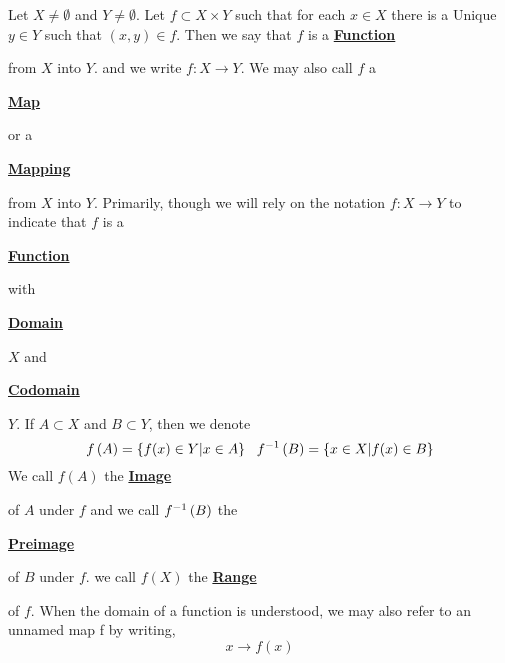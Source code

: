 \newcommand{\Function}[0]{
    \textbf{\hyperref[def:Function]{Function}}
}
\newcommand{\Functions}[0]{
    \textbf{\hyperref[def:Function]{Functions}}
}
\newcommand{\Map}[0]{
    \textbf{\hyperref[def:Function]{Map}}
}
\newcommand{\Maps}[0]{
    \textbf{\hyperref[def:Function]{Maps}}
}
\newcommand{\Mapping}[0]{
    \textbf{\hyperref[def:Function]{Mapping}}
}
\newcommand{\Mappings}[0]{
    \textbf{\hyperref[def:Function]{Mappings}}
}

\newcommand{\FunctionDomain}[0]{
    \textbf{\hyperref[def:Function]{Domain}}
}
\newcommand{\FunctionDomains}[0]{
    \textbf{\hyperref[def:Function]{Domains}}
}
\newcommand{\FunctionCodomain}[0]{
    \textbf{\hyperref[def:Function]{Codomain}}
}
\newcommand{\FunctionCodomains}[0]{
    \textbf{\hyperref[def:Function]{Codomains}}
}
\newcommand{\FunctionRange}[0]{
    \textbf{\hyperref[def:Function]{Range}}
}
\newcommand{\FunctionRanges}[0]{
    \textbf{\hyperref[def:Function]{Ranges}}
}

\newcommand{\FunctionImage}[0]{
    \textbf{\hyperref[def:Function]{Image}}
}
\newcommand{\FunctionImages}[0]{
    \textbf{\hyperref[def:Function]{Images}}
}
\newcommand{\FunctionPreimage}[0]{
    \textbf{\hyperref[def:Function]{Preimage}}
}
\newcommand{\FunctionPreimages}[0]{
    \textbf{\hyperref[def:Function]{Preimages}}
}\begin{df}[Function]
\label{def:Function}

\rm
    Let $X \neq \emptyset$ 
    and $Y \neq \emptyset$.
    Let $f \subset X \times Y$ 
    such that for each $x \in X$ 
    there is a Unique $y \in Y$ 
    such that 
    $(x,y) \in f$. 
    Then we say that $f$ 
    is a \Function
    from $X$ into $Y$. 
    and we write 
    $f:X \to Y$. 
    We may also call $f$ 
    a 
    \Map
    or a 
    \Mapping 
    from $X$ 
    into $Y$. 
    Primarily, though 
    we will rely on the notation 
    $f:X \to Y$ to indicate
    that 
    $f$ is a 
    \Function
    with 
    \FunctionDomain
    $X$
    and 
    \FunctionCodomain
    $Y$.
    If $A \subset X$ 
    and $B \subset Y$, 
    then we denote 
    \begin{equation*}
    f\left( A\right)= \{f(x)\in Y | x \in A\} \\
    \; \; \;
    f^{-1}\left( B\right) = \{x \in X | f(x) \in B \}
    \end{equation*}
    We call 
    $f(A)$ 
    the \FunctionImage
    of $A$ under $f$
    and we call
    $f^{-1}\left( B\right)$ 
    the 
    \FunctionPreimage
    of $B$ under
    $f$. 
    we call $f(X)$ 
    the \FunctionRange
    of $f$. 
    When the domain of a function is understood, we may also refer to an unnamed map
    f by writing, 
    \begin{equation*}
    x \to f(x)
    \end{equation*}
   
\end{df}
